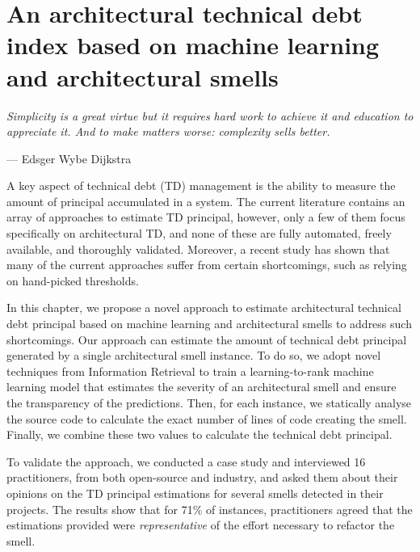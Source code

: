 \setlength{\headheight}{1.2cm}
\renewcommand{\publ}{\flushleft\footnotesize{This chapter has been submitted to a peer-reviewed journal.\\[0.1cm]}}

\chapter{An architectural technical debt index based on machine learning and architectural smells}
\label{chap:6}
\epigraph{\emph{Simplicity is a great virtue but it requires hard work to achieve it and education to appreciate it. And to make matters worse: complexity sells better.}}{--- Edsger Wybe Dijkstra}

\begin{Abstract}
	A key aspect of technical debt (TD) management is the ability to measure the amount of principal accumulated in a system.
    The current literature contains an array of approaches to estimate TD principal, however, only a few of them focus specifically on architectural TD, and none of these are fully automated, freely available, and thoroughly validated.
    Moreover, a recent study has shown that many of the current approaches suffer from certain shortcomings, such as relying on hand-picked thresholds.
    
    In this chapter, we propose a novel approach to estimate architectural technical debt principal based on machine learning and architectural smells to address such shortcomings.
    Our approach can estimate the amount of technical debt principal generated by a single architectural smell instance.
    To do so, we adopt novel techniques from Information Retrieval to train a learning-to-rank machine learning model that estimates the severity of an architectural smell and ensure the transparency of the predictions.
    Then, for each instance, we statically analyse the source code to calculate the exact number of lines of code creating the smell.
    Finally, we combine these two values to calculate the technical debt principal.
    
    To validate the approach, we conducted a case study and interviewed 16 practitioners, from both open-source and industry, and asked them about their opinions on the TD principal estimations for several smells detected in their projects.
    The results show that for 71\% of instances, practitioners agreed that the estimations provided were \emph{representative} of the effort necessary to refactor the smell.
\end{Abstract}

